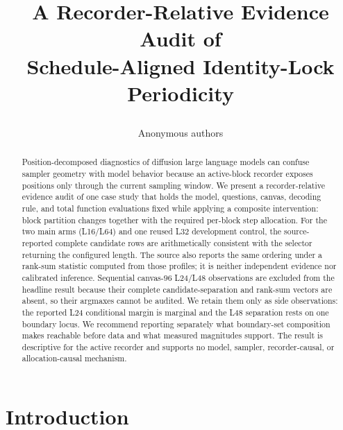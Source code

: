 \documentclass{article}
\title{\raggedright A Recorder-Relative Evidence Audit of \\
Schedule-Aligned Identity-Lock Periodicity}
\author{Anonymous authors}
\date{}
\begin{document}
\maketitle
\ificlrfinal
\else
\fi
\pagestyle{fancy}
\thispagestyle{fancy}

\begin{abstract}
Position-decomposed diagnostics of diffusion large language models can confuse
sampler geometry with model behavior because an active-block recorder exposes
positions only through the current sampling window.  We present a
recorder-relative evidence audit of one case study that holds the model,
questions, canvas, decoding rule, and total function evaluations fixed while
applying a composite intervention: block partition changes together with the
required per-block step allocation.  For the two main arms (L16/L64) and one
reused L32 development control, the source-reported complete candidate rows are
arithmetically consistent with the selector returning the configured length.
The source also reports the same ordering under a rank-sum statistic computed
from those profiles; it is neither independent evidence nor calibrated
inference.  Sequential canvas-$96$ L24/L48 observations are excluded from the
headline result because their complete candidate-separation and rank-sum vectors
are absent, so their argmaxes cannot be audited.  We retain them only as side
observations: the reported L24 conditional margin is marginal and the L48
separation rests on one boundary locus.  We recommend reporting separately what
boundary-set composition makes reachable before data and what measured
magnitudes support.  The result is descriptive for the active recorder and
supports no model, sampler, recorder-causal, or allocation-causal mechanism.
\end{abstract}

\section{Introduction}\label{sec:intro}
\end{document}
